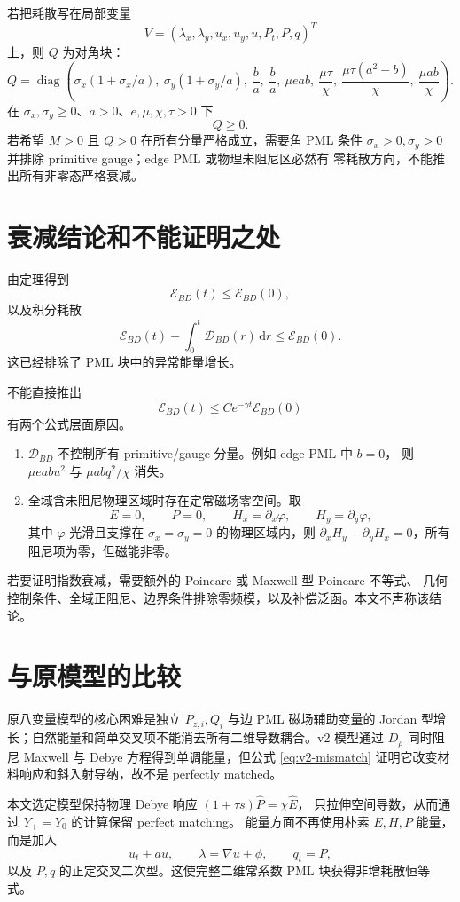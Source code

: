 \documentclass[UTF8,a4paper,11pt]{ctexart}
\newcommand{\dd}{\,\mathrm d}
\newcommand{\sx}{\sigma_x}
\newcommand{\sy}{\sigma_y}
\newcommand{\Ecal}{\mathcal E}
\newcommand{\Dcal}{\mathcal D}
\newcommand{\diag}{\operatorname{diag}}
\begin{document}
若把耗散写在局部变量
\[
V=(\lambda_x,\lambda_y,u_x,u_y,u,P_t,P,q)^T
\]
上，则 \(Q\) 为对角块：
\[
Q=\diag\!\left(
\sx(1+\sx/a),\ \sy(1+\sy/a),\
\frac{b}{a},\ \frac{b}{a},\
\mu eab,\ \frac{\mu\tau}{\chi},\
\frac{\mu\tau(a^2-b)}{\chi},\
\frac{\mu ab}{\chi}
\right).
\]
在 \(\sx,\sy\ge0\)、\(a>0\)、\(e,\mu,\chi,\tau>0\) 下
\[
Q\ge0.
\]
若希望 \(M>0\) 且 \(Q>0\) 在所有分量严格成立，需要角 PML 条件
\(\sx>0,\sy>0\) 并排除 primitive gauge；edge PML 或物理未阻尼区必然有
零耗散方向，不能推出所有非零态严格衰减。

\section{衰减结论和不能证明之处}

由定理得到
\[
\Ecal_{BD}(t)\le \Ecal_{BD}(0),
\]
以及积分耗散
\[
\Ecal_{BD}(t)+\int_0^t\Dcal_{BD}(r)\dd r\le\Ecal_{BD}(0).
\]
这已经排除了 PML 块中的异常能量增长。

不能直接推出
\[
\Ecal_{BD}(t)\le C e^{-\gamma t}\Ecal_{BD}(0)
\]
有两个公式层面原因。

\begin{enumerate}
\item \(\Dcal_{BD}\) 不控制所有 primitive/gauge 分量。例如 edge PML 中 \(b=0\)，
则 \(\mu eab u^2\) 与 \(\mu abq^2/\chi\) 消失。
\item 全域含未阻尼物理区域时存在定常磁场零空间。取
\[
E=0,\qquad P=0,\qquad H_x=\partial_x\varphi,\qquad H_y=\partial_y\varphi,
\]
其中 \(\varphi\) 光滑且支撑在 \(\sx=\sy=0\) 的物理区域内，则
\(\partial_xH_y-\partial_yH_x=0\)，所有阻尼项为零，但磁能非零。
\end{enumerate}
若要证明指数衰减，需要额外的 Poincare 或 Maxwell 型 Poincare 不等式、
几何控制条件、全域正阻尼、边界条件排除零频模，以及补偿泛函。本文不声称该结论。

\section{与原模型的比较}

原八变量模型的核心困难是独立 \(P_{z,i},Q_i\) 与边 PML 磁场辅助变量的 Jordan
型增长；自然能量和简单交叉项不能消去所有二维导数耦合。v2 模型通过
\(D_\rho\) 同时阻尼 Maxwell 与 Debye 方程得到单调能量，但公式
\eqref{eq:v2-mismatch} 证明它改变材料响应和斜入射导纳，故不是 perfectly matched。

本文选定模型保持物理 Debye 响应 \((1+\tau s)\widehat P=\chi\widehat E\)，
只拉伸空间导数，从而通过 \(Y_+=Y_0\) 的计算保留 perfect matching。
能量方面不再使用朴素 \(E,H,P\) 能量，而是加入
\[
u_t+a u,\qquad \lambda=\nabla u+\phi,\qquad q_t=P,
\]
以及 \(P,q\) 的正定交叉二次型。这使完整二维常系数 PML 块获得非增耗散恒等式。
\end{document}
